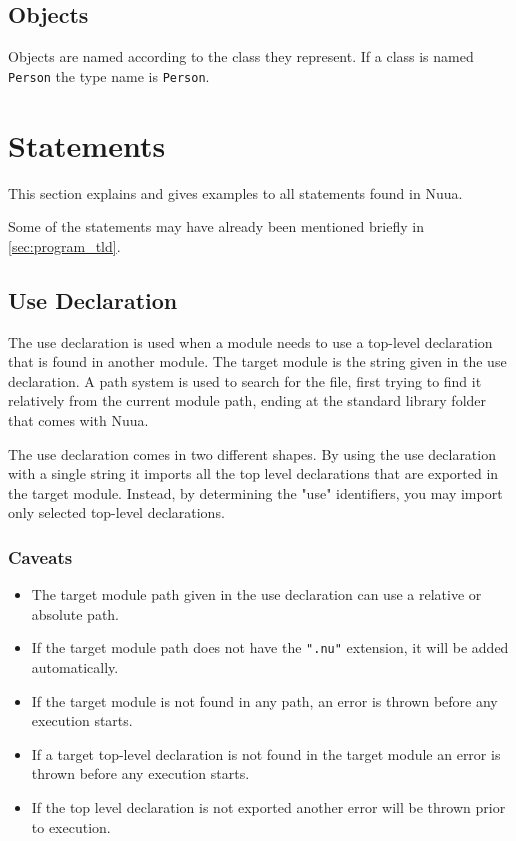 \subsection{Objects}

Objects are named according to the class they represent. If a class is named \texttt{Person} the type name is \texttt{Person}.

\section{Statements}

This section explains and gives examples to all statements found in Nuua.

Some of the statements may have already been mentioned briefly in \autoref{sec:program_tld}.

\subsection{Use Declaration}

The use declaration is used when a module needs to use a top-level declaration
that is found in another module. The target module is the string given in the use declaration. A path system is used to search for the file,
first trying to find it relatively from the current module path, ending at the standard library folder that comes with Nuua.

The use declaration comes in two different shapes. By using the use declaration with a single string it imports all the top level
declarations that are exported in the target module. Instead, by determining the "use" identifiers, you may import only selected top-level
declarations.

\subsubsection{Caveats}

\begin{itemize}
    \item The target module path given in the use declaration can use a relative or absolute path.
    \item If the target module path does not have the \texttt{".nu"} extension, it will be added automatically.
    \item If the target module is not found in any path, an error is thrown before any execution starts.
    \item If a target top-level declaration is not found in the target module an error is thrown before any execution starts.
    \item If the top level declaration is not exported another error will be thrown prior to execution.
\end{itemize}

